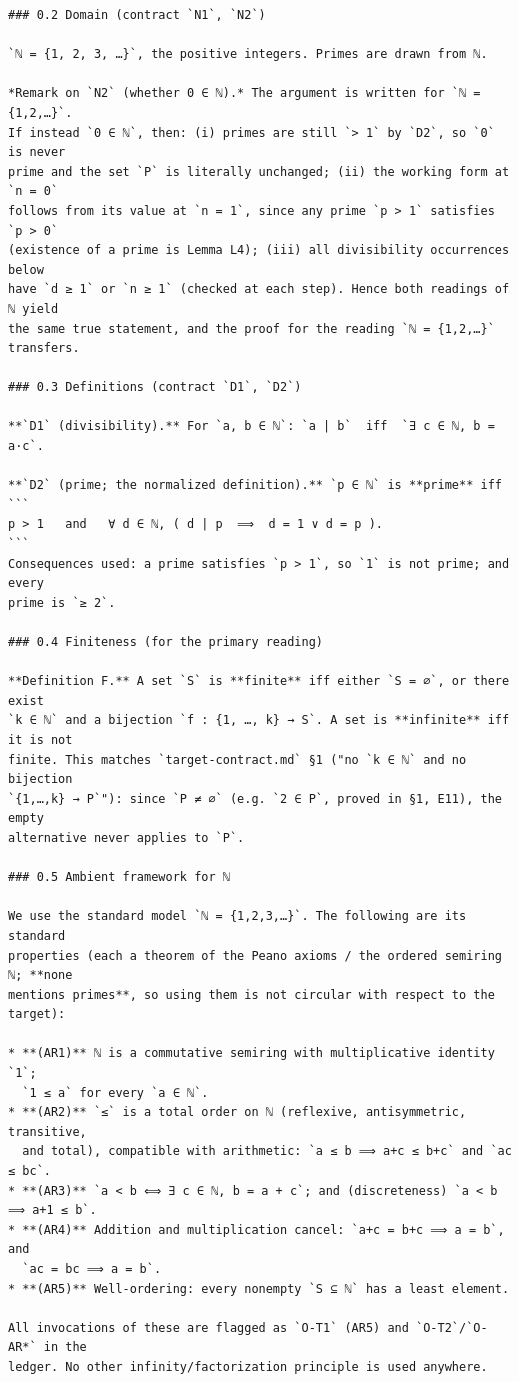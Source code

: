 \documentclass[11pt]{article}
\begin{document}
\begin{verbatim}
### 0.2 Domain (contract `N1`, `N2`)

`ℕ = {1, 2, 3, …}`, the positive integers. Primes are drawn from ℕ.

*Remark on `N2` (whether 0 ∈ ℕ).* The argument is written for `ℕ = {1,2,…}`.
If instead `0 ∈ ℕ`, then: (i) primes are still `> 1` by `D2`, so `0` is never
prime and the set `P` is literally unchanged; (ii) the working form at `n = 0`
follows from its value at `n = 1`, since any prime `p > 1` satisfies `p > 0`
(existence of a prime is Lemma L4); (iii) all divisibility occurrences below
have `d ≥ 1` or `n ≥ 1` (checked at each step). Hence both readings of ℕ yield
the same true statement, and the proof for the reading `ℕ = {1,2,…}` transfers.

### 0.3 Definitions (contract `D1`, `D2`)

**`D1` (divisibility).** For `a, b ∈ ℕ`: `a | b`  iff  `∃ c ∈ ℕ, b = a·c`.

**`D2` (prime; the normalized definition).** `p ∈ ℕ` is **prime** iff
```
p > 1   and   ∀ d ∈ ℕ, ( d | p  ⟹  d = 1 ∨ d = p ).
```
Consequences used: a prime satisfies `p > 1`, so `1` is not prime; and every
prime is `≥ 2`.

### 0.4 Finiteness (for the primary reading)

**Definition F.** A set `S` is **finite** iff either `S = ∅`, or there exist
`k ∈ ℕ` and a bijection `f : {1, …, k} → S`. A set is **infinite** iff it is not
finite. This matches `target-contract.md` §1 ("no `k ∈ ℕ` and no bijection
`{1,…,k} → P`"): since `P ≠ ∅` (e.g. `2 ∈ P`, proved in §1, E11), the empty
alternative never applies to `P`.

### 0.5 Ambient framework for ℕ

We use the standard model `ℕ = {1,2,3,…}`. The following are its standard
properties (each a theorem of the Peano axioms / the ordered semiring ℕ; **none
mentions primes**, so using them is not circular with respect to the target):

* **(AR1)** ℕ is a commutative semiring with multiplicative identity `1`;
  `1 ≤ a` for every `a ∈ ℕ`.
* **(AR2)** `≤` is a total order on ℕ (reflexive, antisymmetric, transitive,
  and total), compatible with arithmetic: `a ≤ b ⟹ a+c ≤ b+c` and `ac ≤ bc`.
* **(AR3)** `a < b ⟺ ∃ c ∈ ℕ, b = a + c`; and (discreteness) `a < b ⟹ a+1 ≤ b`.
* **(AR4)** Addition and multiplication cancel: `a+c = b+c ⟹ a = b`, and
  `ac = bc ⟹ a = b`.
* **(AR5)** Well-ordering: every nonempty `S ⊆ ℕ` has a least element.

All invocations of these are flagged as `O-T1` (AR5) and `O-T2`/`O-AR*` in the
ledger. No other infinity/factorization principle is used anywhere.


\end{verbatim}
\end{document}
